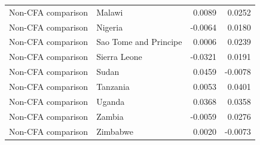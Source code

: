 \begin{table}
\begin{tabular}[t]{llrr}
Non-CFA comparison & Malawi & 0.0089 & 0.0252\\
Non-CFA comparison & Nigeria & -0.0064 & 0.0180\\
Non-CFA comparison & Sao Tome and Principe & 0.0006 & 0.0239\\
Non-CFA comparison & Sierra Leone & -0.0321 & 0.0191\\
\addlinespace
Non-CFA comparison & Sudan & 0.0459 & -0.0078\\
Non-CFA comparison & Tanzania & 0.0053 & 0.0401\\
Non-CFA comparison & Uganda & 0.0368 & 0.0358\\
Non-CFA comparison & Zambia & -0.0059 & 0.0276\\
Non-CFA comparison & Zimbabwe & 0.0020 & -0.0073\\
\bottomrule
\end{tabular}
\end{table}